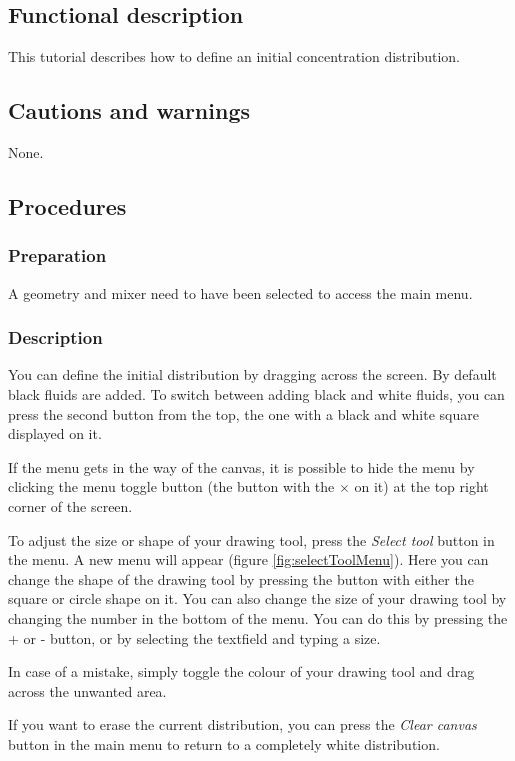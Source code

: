 \subsection{Functional description}
This tutorial describes how to define an initial concentration distribution.

\subsection{Cautions and warnings}
None.

\subsection{Procedures}
\subsubsection{Preparation}
A geometry and mixer need to have been selected to access the main menu.

\subsubsection{Description}
You can define the initial distribution by dragging across the screen. By default black fluids are added. To switch between adding black and white fluids, you can press the second button from the top, the one with a black and white square displayed on it.

If the menu gets in the way of the canvas, it is possible to hide the menu by clicking the menu toggle button (the button with the $\times$ on it) at the top right corner of the screen.

 To adjust the size or shape of your drawing tool, press the \emph{Select tool} button in the menu. A new menu will appear (figure \ref{fig:selectToolMenu}). Here you can change the shape of the drawing tool by pressing the button with either the square or circle shape on it. You can also change the size of your drawing tool by changing the number in the bottom of the menu. You can do this by pressing the + or - button, or by selecting the textfield and typing a size.


In case of a mistake, simply toggle the colour of your drawing tool and drag across the unwanted area.

If you want to erase the current distribution, you can press the \emph{Clear canvas} button in the main menu to return to a completely white distribution.

